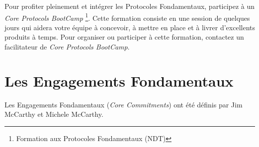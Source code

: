 \documentclass[paper=6in:9in,pagesize=pdftex,headinclude=on,footinclude=on,11pt]{scrbook}
\begin{document}
Pour profiter pleinement et intégrer les Protocoles Fondamentaux, participez à un \emph{Core Protocols BootCamp}
\footnote{Formation aux Protocoles Fondamentaux (NDT)}. Cette formation consiste en une session de quelques jours qui aidera
votre équipe à concevoir, à mettre en place et à livrer d'excellents produits à temps. Pour organiser ou participer à cette
formation, contactez un facilitateur de \emph{Core Protocols BootCamp}.

\chapter{Les Engagements Fondamentaux} \label{engagements}

Les Engagements Fondamentaux (\emph{Core Commitments}) ont été définis par Jim McCarthy et Michele McCarthy.
\end{document}
